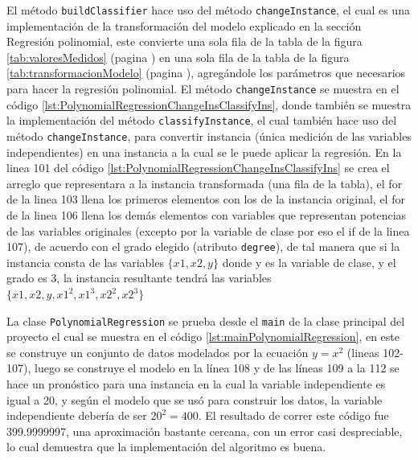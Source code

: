 El método \texttt{buildClassifier} hace uso del método \texttt{changeInstance}, el cual es una implementación de la transformación del modelo explicado en la sección Regresión polinomial, 
este convierte una sola fila de la tabla de la figura \ref{tab:valoresMedidos} (pagina \pageref{tab:valoresMedidos}) en una sola fila de la tabla de la figura \ref{tab:transformacionModelo} (pagina \pageref{tab:transformacionModelo}), agregándole los parámetros que necesarios para hacer la regresión polinomial. 
El método \texttt{changeInstance} se muestra en el código \ref{lst:PolynomialRegressionChangeInsClassifyIns}, donde también se muestra la implementación del método \texttt{classifyInstance}, el cual también hace uso del método \texttt{changeInstance}, para convertir instancia (única medición de las variables independientes) en una instancia a la cual se le puede aplicar la regresión.
En la linea 101 del código \ref{lst:PolynomialRegressionChangeInsClassifyIns} se crea el arreglo que representara a la instancia transformada (una fila de la tabla), el for de la linea 103 llena los primeros elementos con los de la instancia original, el for de la linea 106 llena los demás elementos con 
variables que representan potencias de las variables originales (excepto por la variable de clase por eso el if de la linea 107), de acuerdo con el grado elegido (atributo \texttt{degree}), de tal manera que si la instancia consta de las variables $\{x1,x2,y\}$ donde y es la variable de clase, y el grado es 3, la instancia resultante tendrá las variables $\{x1,x2,y,x1^2,x1^3,x2^2,x2^3\}$ 

La clase \texttt{PolynomialRegression} se prueba desde el \texttt{main} de la clase principal del proyecto el cual se muestra en el código \ref{lst:mainPolynomialRegression}, en este se construye un conjunto de datos modelados por la ecuación $y= x^{2}$ (lineas 102-107), luego se construye el modelo en la línea 108 y de las líneas 109 a la 112 se hace un pronóstico para una instancia en la cual la variable independiente es igual a 20, y según el modelo que se usó para construir los datos, la variable independiente debería de ser $20^{2}= 400$.
El resultado de correr este código fue 399.9999997, una aproximación bastante cercana, con un error casi despreciable, lo cual demuestra que la implementación del algoritmo es buena.


